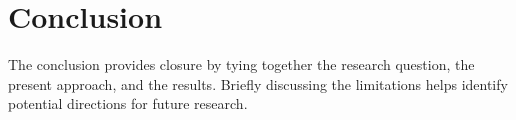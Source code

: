 
\chapter{Conclusion}
\label{ch:conclusion}

The conclusion provides closure by tying together the research question, the present approach, and the results.
Briefly discussing the limitations helps identify potential directions for future research.





